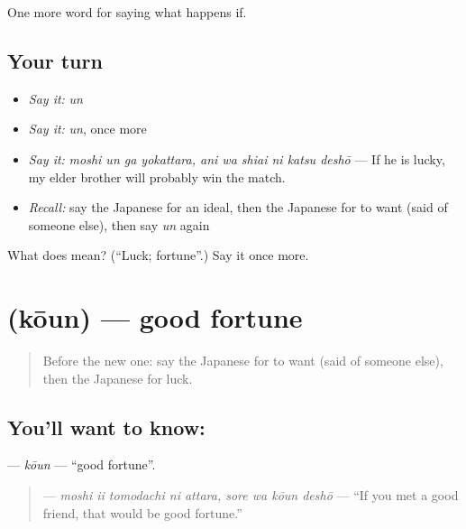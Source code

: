 \begin{grammarlens}[title={What you've built}]
One more word for saying what happens if.
\end{grammarlens}

\subsection*{Your turn}
\begin{itemize}
\raggedright
  \item \emph{Say it:} \emph{un}
  \item \emph{Say it:} \emph{un}, once more
  \item \emph{Say it:} \emph{moshi un ga yokattara, ani wa shiai ni katsu deshō} — If he is lucky, my elder brother will probably win the match.
  \item \emph{Recall:} say the Japanese for an ideal, then the Japanese for to want (said of someone else), then say \emph{un} again
\end{itemize}

\begin{tcolorbox}[breakable,colback=teal!4,colframe=teal!35!black,title={Before you move on}]
What does  mean? (\textquotedblleft{}Luck; fortune\textquotedblright{}.) Say it once more.
\end{tcolorbox}
\section[\texorpdfstring{\ja{こううん} (kōun)}{こううん (kōun)}]{ (kōun) — good fortune}

\label{lesson:JA-C508-kouun}



\begin{quote}
Before the new one: say the Japanese for to want (said of someone else), then the Japanese for luck.
\end{quote}

\subsection*{You'll want to know: }
\textbf{} — \emph{kōun} — \textquotedblleft{}good fortune\textquotedblright{}.

\begin{quote}
\textbf{    } — \emph{moshi ii tomodachi ni attara, sore wa kōun deshō} — \textquotedblleft{}If you met a good friend, that would be good fortune.\textquotedblright{}
\end{quote}

